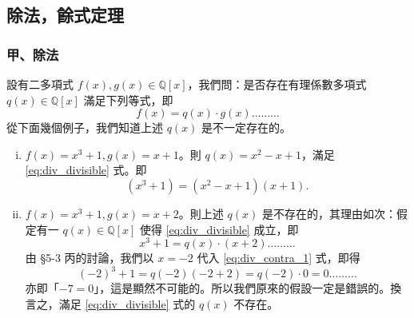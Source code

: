 \subsection{除法，餘式定理}\label{sec:5-4}

\subsubsection*{甲、除法}\label{subsec:5-4-a}

設有二多項式 $f(x), g(x) \in \mathbb{Q}[x]$，我們問：是否存在有理係數多項式 $q(x) \in \mathbb{Q}[x]$ 滿足下列等式，即
\begin{equation}\label{eq:div_divisible}
  f(x) = q(x) \cdot g(x) \dots\dots\dots
\end{equation}
從下面幾個例子，我們知道上述 $q(x)$ 是不一定存在的。

\begin{example}\label{ex:5-4-1}
\leavevmode
\begin{enumerate}[(i)]
  \item $f(x)=x^3+1, g(x)=x+1$。則 $q(x)=x^2-x+1$，滿足 \eqref{eq:div_divisible} 式。即
  \begin{equation*}
    (x^3+1) = (x^2-x+1)(x+1).
  \end{equation*}

  \item $f(x)=x^3+1, g(x)=x+2$。則上述 $q(x)$ 是不存在的，其理由如次：假定有一 $q(x) \in \mathbb{Q}[x]$ 使得 \eqref{eq:div_divisible} 成立，即
  \begin{equation}\label{eq:div_contra_1}
    x^3+1 = q(x) \cdot (x+2) \dots\dots\dots
  \end{equation}
  由 \S 5-3 丙的討論，我們以 $x=-2$ 代入 \eqref{eq:div_contra_1} 式，即得
  \begin{equation}\label{eq:div_contra_2}
    (-2)^3+1 = q(-2)(-2+2) = q(-2) \cdot 0 = 0 \dots\dots\dots
  \end{equation}
  亦即「$-7=0$」，這是顯然不可能的。所以我們原來的假設一定是錯誤的。換言之，滿足 \eqref{eq:div_divisible} 式的 $q(x)$ 不存在。
\end{enumerate}
\end{example}

